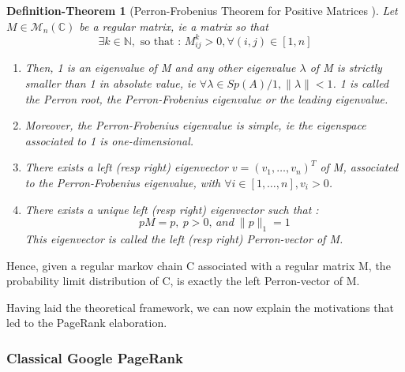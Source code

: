 \documentclass[sn-mathphys]{sn-jnl}%
\theoremstyle{thmstyleone}%
\newtheorem{definition-theo}[theo]{Definition-Theorem}
\theoremstyle{thmstyletwo}%
\theoremstyle{thmstylethree}%
\begin{document}
\begin{definition-theo}[Perron-Frobenius Theorem for Positive Matrices \cite{meyer_2000}]\label{def-theo:perron-frob}
  Let $M \in \mathcal{M}_n(\mathbb{C})$ be a regular matrix, ie a
  matrix so that
\begin{equation*}
    \exists k \in \mathbb{N}, \mbox{ so that : } M^k_{ij} > 0, \forall (i,j) \in [1, n]
\end{equation*}

\begin{enumerate}
\item Then, 1 is an eigenvalue of M and any other eigenvalue $\lambda$
  of M is strictly smaller than 1 in absolute value, ie
  $\forall \lambda \in Sp(A) / 1, \|\lambda\| < 1$. 1 is called the
  Perron root, the Perron-Frobenius eigenvalue or the leading
  eigenvalue.
\item Moreover, the Perron-Frobenius eigenvalue is simple, ie the
  eigenspace associated to 1 is one-dimensional.
\item There exists a left (resp right) eigenvector
  $v = (v_1, \hdots, v_n)^T$ of M, associated to the Perron-Frobenius
  eigenvalue, with $\forall i \in [1, \hdots, n], v_i > 0$.
\item There exists a unique left (resp right) eigenvector such that :
    \begin{equation*}
        p M = p, \ p>0, \ and \ \|p\|_1 = 1
    \end{equation*}
    This eigenvector is called the left (resp right) Perron-vector of M.

\end{enumerate}

\end{definition-theo}

Hence, given a regular markov chain C associated with a regular matrix
M, the probability limit distribution of C, is exactly the left
Perron-vector of M.

Having laid the theoretical framework, we can now explain the
motivations that led to the PageRank elaboration.

\subsubsection{Classical Google PageRank}
\end{document}
